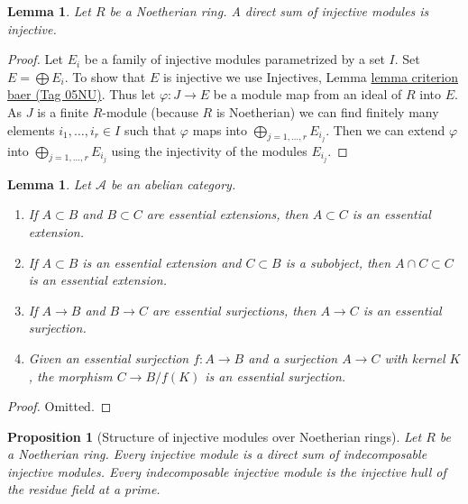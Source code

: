 \documentclass{amsart}
\theoremstyle{plain}
\newtheorem{proposition}[subsection]{Proposition}
\newtheorem{lemma}[subsection]{Lemma}
\theoremstyle{definition}
\theoremstyle{remark}
\numberwithin{equation}{subsection}
\begin{document}
\begin{lemma}
\label{lemma-sum-injective-modules}
Let $R$ be a Noetherian ring. A direct sum of injective modules
is injective.
\end{lemma}

\begin{proof}
Let $E_i$ be a family of injective modules parametrized by a set $I$.
Set $E = \bigoplus E_i$. To show that $E$ is injective we use
Injectives, Lemma \href{https://stacks.math.columbia.edu/tag/05NU}{lemma criterion baer (Tag 05NU)}.
Thus let $\varphi : J \to E$ be a module map from an ideal of $R$
into $E$. As $J$ is a finite $R$-module (because $R$ is Noetherian)
we can find finitely many elements $i_1, \ldots, i_r \in I$
such that $\varphi$ maps into $\bigoplus_{j = 1, \ldots, r} E_{i_j}$.
Then we can extend $\varphi$ into $\bigoplus_{j = 1, \ldots, r} E_{i_j}$
using the injectivity of the modules $E_{i_j}$.
\end{proof}


\begin{lemma}
\label{lemma-essential}
Let $\mathcal{A}$ be an abelian category.
\begin{enumerate}
\item If $A \subset B$ and $B \subset C$ are essential extensions, then
$A \subset C$ is an essential extension.
\item If $A \subset B$ is an essential extension and $C \subset B$
is a subobject, then $A \cap C \subset C$ is an essential extension.
\item If $A \to B$ and $B \to C$ are essential surjections, then
$A \to C$ is an essential surjection.
\item Given an essential surjection $f : A \to B$ and a surjection
$A \to C$ with kernel $K$, the morphism $C \to B/f(K)$ is an essential
surjection.
\end{enumerate}
\end{lemma}

\begin{proof}
Omitted.
\end{proof}


\begin{proposition}[Structure of injective modules over Noetherian rings]
\label{proposition-structure-injectives-noetherian}
Let $R$ be a Noetherian ring.
Every injective module is a direct sum of indecomposable injective modules.
Every indecomposable injective module is the injective hull of
the residue field at a prime.
\end{proposition}
\end{document}

